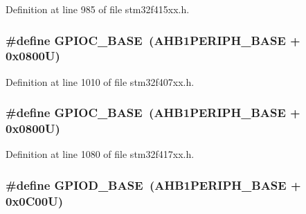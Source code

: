 Definition at line 985 of file stm32f415xx.\+h.

\subsubsection[{\texorpdfstring{G\+P\+I\+O\+C\+\_\+\+B\+A\+SE}{GPIOC_BASE}}]{\setlength{\rightskip}{0pt plus 5cm}\#define G\+P\+I\+O\+C\+\_\+\+B\+A\+SE~({\bf A\+H\+B1\+P\+E\+R\+I\+P\+H\+\_\+\+B\+A\+SE} + 0x0800\+U)}\hypertarget{group___peripheral__registers__structures_ga26f267dc35338eef219544c51f1e6b3f}{}\label{group___peripheral__registers__structures_ga26f267dc35338eef219544c51f1e6b3f}


Definition at line 1010 of file stm32f407xx.\+h.

\subsubsection[{\texorpdfstring{G\+P\+I\+O\+C\+\_\+\+B\+A\+SE}{GPIOC_BASE}}]{\setlength{\rightskip}{0pt plus 5cm}\#define G\+P\+I\+O\+C\+\_\+\+B\+A\+SE~({\bf A\+H\+B1\+P\+E\+R\+I\+P\+H\+\_\+\+B\+A\+SE} + 0x0800\+U)}\hypertarget{group___peripheral__registers__structures_ga26f267dc35338eef219544c51f1e6b3f}{}\label{group___peripheral__registers__structures_ga26f267dc35338eef219544c51f1e6b3f}


Definition at line 1080 of file stm32f417xx.\+h.

\subsubsection[{\texorpdfstring{G\+P\+I\+O\+D\+\_\+\+B\+A\+SE}{GPIOD_BASE}}]{\setlength{\rightskip}{0pt plus 5cm}\#define G\+P\+I\+O\+D\+\_\+\+B\+A\+SE~({\bf A\+H\+B1\+P\+E\+R\+I\+P\+H\+\_\+\+B\+A\+SE} + 0x0\+C00\+U)}\hypertarget{group___peripheral__registers__structures_ga1a93ab27129f04064089616910c296ec}{}\label{group___peripheral__registers__structures_ga1a93ab27129f04064089616910c296ec}


